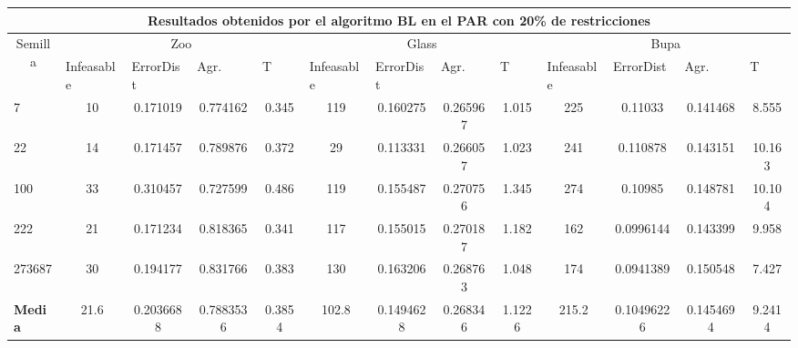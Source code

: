 \begin{table}[H]
	\scriptsize

	\begin{adjustwidth}{-1cm}{-1cm}%
	
	\begin{tabular}{|l|c|c|c|c|c|c|c|c|c|c|c|c|}
	\hline
	\multicolumn{13}{|c|}{\textbf{Resultados obtenidos por el algoritmo BL en el PAR con 20\% de restricciones}}                                                                                                                                                                                                                                                                                                                                            \\ \hline
	\multicolumn{1}{|c|}{\multirow{2}{*}{Semilla}} & \multicolumn{4}{c|}{Zoo}                                                                                          & \multicolumn{4}{c|}{Glass}                                                                                         & \multicolumn{4}{c|}{Bupa}                                                                                          \\ \cline{2-13} 
	\multicolumn{1}{|c|}{}                                  & \multicolumn{1}{l|}{Infeasable} & \multicolumn{1}{l|}{ErrorDist} & \multicolumn{1}{l|}{Agr.} & \multicolumn{1}{l|}{T} & \multicolumn{1}{l|}{Infeasable} & \multicolumn{1}{l|}{ErrorDist} & \multicolumn{1}{l|}{Agr.} & \multicolumn{1}{l|}{T} & \multicolumn{1}{l|}{Infeasable} & \multicolumn{1}{l|}{ErrorDist} & \multicolumn{1}{l|}{Agr.} & \multicolumn{1}{l|}{T} \\ \hline
	7      & 10 & 0.171019 & 0.774162 & 0.345                    &  119 & 0.160275 & 0.265967 & 1.015			 			&  225 & 0.11033 & 0.141468 & 8.555 \\ \hline
	22     & 14 & 0.171457 & 0.789876 & 0.372                   &	29 & 0.113331 & 0.266057 & 1.023					    & 241 & 0.110878 & 0.143151 & 10.163		\\ \hline
	100    & 33 & 0.310457 & 0.727599 & 0.486		             &	119 & 0.155487 & 0.270756 & 1.345				        & 274 & 0.10985 & 0.148781 & 10.104		\\ \hline
	222    &  21 & 0.171234 & 0.818365 & 0.341                  &	117 & 0.155015 & 0.270187 & 1.182				        & 162 & 0.0996144 & 0.143399 & 9.958		\\ \hline
	273687 &   30 & 0.194177 & 0.831766 & 0.383                  &  130 & 0.163206 & 0.268763 & 1.048					    & 174 & 0.0941389 & 0.150548 & 7.427		\\ \hline
	\textbf{Media}  & 21.6 & 0.2036688 & 0.7883536 & 0.3854     & 102.8 & 0.1494628 & 0.268346 & 1.1226 & 215.2 & 0.10496226 & 0.1454694 & 9.2414                  \\ \hline
	\end{tabular}
	
	\end{adjustwidth}
	
\end{table}	

